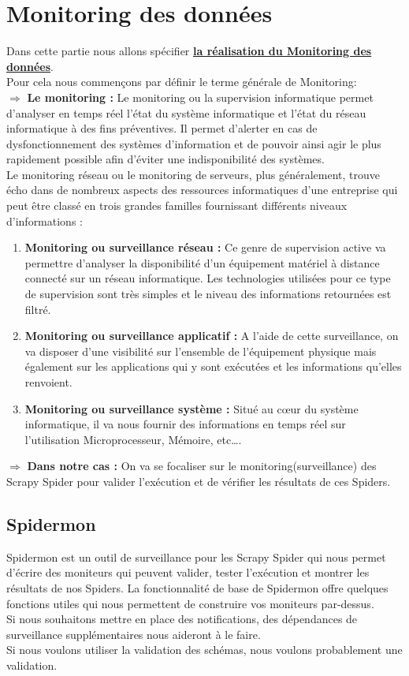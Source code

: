 \section{Monitoring des données}
Dans cette partie nous allons spécifier {\bf\underline{la réalisation du Monitoring des données}}.\\
Pour cela nous commençons par définir le terme générale de Monitoring:\\
$\Rightarrow$ \textbf{Le monitoring \cite{monitoring} :} Le monitoring ou la supervision informatique permet d’analyser en temps réel l’état du système informatique et l’état du réseau informatique à des fins préventives. Il permet d’alerter en cas de dysfonctionnement des systèmes d’information et de pouvoir ainsi agir le plus rapidement possible afin d’éviter une indisponibilité des systèmes. \\Le monitoring réseau ou le monitoring de serveurs, plus généralement, trouve écho dans de nombreux aspects des ressources informatiques d’une entreprise qui peut être classé en trois grandes familles fournissant différents niveaux d’informations : 
\begin{enumerate}
    \item\textbf{Monitoring ou surveillance réseau :} Ce genre de supervision active va permettre d’analyser la disponibilité d’un équipement matériel à distance connecté sur un réseau informatique. Les technologies utilisées pour ce type de supervision  sont très simples et le niveau des informations retournées est filtré.
    \item\textbf{Monitoring ou surveillance applicatif :} A l’aide de cette surveillance, on va disposer d’une visibilité sur l’ensemble de l’équipement physique mais également sur les applications qui y sont exécutées et les informations qu’elles renvoient.
    \item\textbf{Monitoring ou surveillance système :} Situé au cœur du système informatique, il va nous fournir des informations en temps réel sur l’utilisation Microprocesseur, Mémoire, etc….
\end{enumerate}
$\Rightarrow$ \textbf{Dans notre cas :} On va se focaliser sur le monitoring(surveillance) des Scrapy Spider pour valider l'exécution et de vérifier les résultats de ces Spiders.
\subsection{Spidermon}
Spidermon est un outil de surveillance pour les Scrapy Spider qui nous permet d'écrire des moniteurs qui peuvent valider, tester l'exécution et montrer les résultats de nos Spiders.
La fonctionnalité de base de Spidermon offre quelques fonctions utiles qui nous permettent de construire vos moniteurs par-dessus. \\
Si nous souhaitons mettre en place des notifications, des dépendances de surveillance supplémentaires nous aideront à le faire.\\
Si nous voulons utiliser la validation des schémas, nous voulons probablement une validation.

